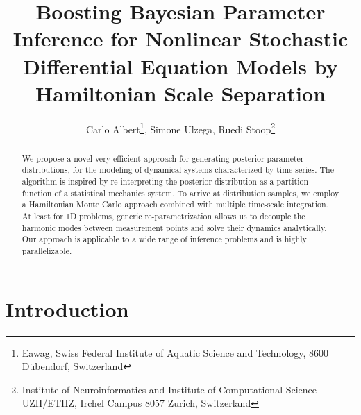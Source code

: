 \documentclass[11pt]{article}
\theoremstyle{definition}
\begin{document}
\title{Boosting Bayesian Parameter Inference for Nonlinear Stochastic Differential Equation Models by Hamiltonian Scale Separation}

\author{Carlo Albert\footnote{Eawag, Swiss Federal Institute of Aquatic Science and Technology, 8600 D\"ubendorf, Switzerland}, Simone Ulzega\footnotemark[1], Ruedi Stoop\footnote{Institute of Neuroinformatics and Institute of Computational Science UZH/ETHZ, Irchel Campus 8057 Zurich, Switzerland}}

\maketitle

\begin{abstract}
We propose a novel very efficient approach for generating posterior parameter distributions, for the modeling of dynamical systems characterized by time-series. The algorithm is inspired by re-interpreting the posterior distribution as a partition function of a
statistical mechanics system. To arrive at distribution samples, we employ a Hamiltonian Monte Carlo approach combined with multiple time-scale integration.
At least for 1D problems, generic re-parametrization allows us to decouple the harmonic modes between measurement points and solve their dynamics analytically.
Our approach is applicable to a wide range of inference problems and is highly parallelizable.


\end{abstract}


\section{Introduction}
\end{document}

